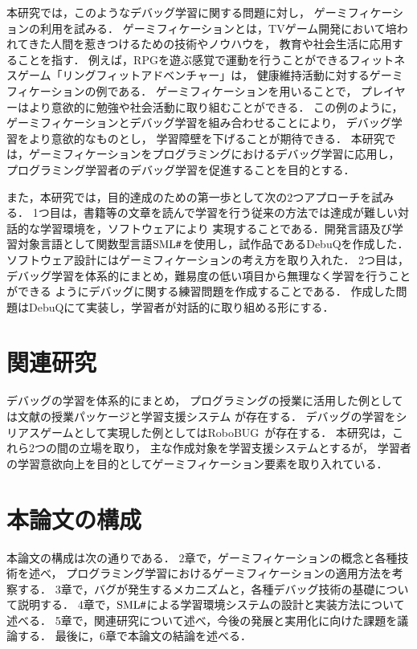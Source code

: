 \documentclass{jreport}
\newcommand\SMLSharp{$\mbox{SML\fontfamily{ptm}\selectfont\#}$}
\begin{document}
本研究では，このようなデバッグ学習に関する問題に対し，
ゲーミフィケーション\cite{Inoue:Gamification}の利用を試みる．
ゲーミフィケーションとは，TVゲーム開発において培われてきた人間を惹きつけるための技術やノウハウを，
教育や社会生活に応用することを指す．
例えば，RPGを遊ぶ感覚で運動を行うことができるフィットネスゲーム「リングフィットアドベンチャー」\cite{ring}は，
健康維持活動に対するゲーミフィケーションの例である．
ゲーミフィケーションを用いることで，
プレイヤーはより意欲的に勉強や社会活動に取り組むことができる．
この例のように，ゲーミフィケーションとデバッグ学習を組み合わせることにより，
デバッグ学習をより意欲的なものとし，
学習障壁を下げることが期待できる．
本研究では，ゲーミフィケーションをプログラミングにおけるデバッグ学習に応用し，
プログラミング学習者のデバッグ学習を促進することを目的とする．

また，本研究では，目的達成のための第一歩として次の2つアプローチを試みる．
1つ目は，書籍等の文章を読んで学習を行う従来の方法では達成が難しい対話的な学習環境を，ソフトウェアにより
実現することである．開発言語及び学習対象言語として関数型言語\SMLSharp を使用し，試作品であるDebuQを作成した．
ソフトウェア設計にはゲーミフィケーションの考え方を取り入れた．
2つ目は，デバッグ学習を体系的にまとめ，難易度の低い項目から無理なく学習を行うことができる
ようにデバッグに関する練習問題を作成することである．
作成した問題はDebuQにて実装し，学習者が対話的に取り組める形にする．

\section{関連研究}
デバッグの学習を体系的にまとめ，
プログラミングの授業に活用した例としては文献\cite{Yama}の授業パッケージと学習支援システム
が存在する．
デバッグの学習をシリアスゲームとして実現した例としてはRoboBUG~\cite{robobug}が存在する．
本研究は，これら2つの間の立場を取り，
主な作成対象を学習支援システムとするが，
学習者の学習意欲向上を目的としてゲーミフィケーション要素を取り入れている．

\section{本論文の構成}
本論文の構成は次の通りである．
2章で，ゲーミフィケーションの概念と各種技術を述べ，
プログラミング学習におけるゲーミフィケーションの適用方法を考察する．
3章で，バグが発生するメカニズムと，各種デバッグ技術の基礎について説明する．
4章で，\SMLSharp による学習環境システムの設計と実装方法について述べる．
5章で，関連研究について述べ，今後の発展と実用化に向けた課題を議論する．
最後に，6章で本論文の結論を述べる．
\end{document}

